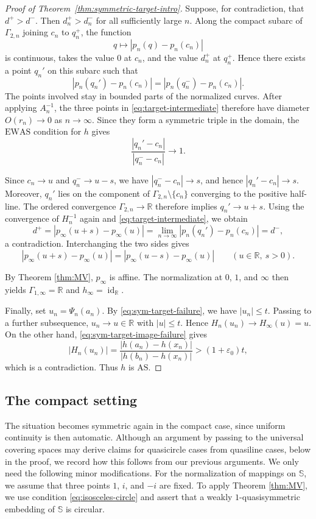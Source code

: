 \documentclass[10pt,a4paper]{amsart}
\numberwithin{equation}{section}
\newcommand{\R}{\mathbb{R}}
\newcommand{\id}{\operatorname{id}}
\begin{document}
\begin{proof}[Proof of Theorem~\ref{thm:symmetric-target-intro}]
Suppose, for contradiction, that $d^+>d^-$.  
Then $d_n^+>d_n^-$ for all sufficiently large $n$.  
Along the compact subarc of $\Gamma_{2,n}$ joining $c_n$ to $q_n^+$, the function
\[
 q\longmapsto |p_n(q)-p_n(c_n)|
\]
is continuous, takes the value $0$ at $c_n$, and the value $d_n^+$ at $q_n^+$.  
Hence there exists a point $q_n'$ on this subarc such that
\begin{equation}\label{eq:target-intermediate}
 |p_n(q_n')-p_n(c_n)|=|p_n(q_n^-)-p_n(c_n)|.
\end{equation}
The points involved stay in bounded parts of the normalized curves.
After applying $A_n^{-1}$, the three points in \eqref{eq:target-intermediate} therefore have diameter $O(r_n)\to0$
as $n \to \infty$.  
Since they form a symmetric  triple in the domain,
the $\mathrm{EWAS}$ condition for $h$ gives
\begin{equation*}
 \frac{|q_n'-c_n|}{|q_n^--c_n|}\to 1.
\end{equation*}

Since $c_n\to u$ and $q_n^-\to u-s$, we have $|q_n^--c_n|\to s$, and hence
$|q_n'-c_n|\to s$.
Moreover, $q_n'$ lies on the component of $\Gamma_{2,n}\setminus\{c_n\}$ converging to the positive half-line.
The ordered convergence $\Gamma_{2,n}\to\R$ therefore implies $q_n'\to  u+s$.
Using the convergence of $H_n^{-1}$ again and \eqref{eq:target-intermediate}, we obtain
\[
 d^+=|p_\infty(u+s)-p_\infty(u)|=\lim_{n\to\infty}|p_n(q_n')-p_n(c_n)|=d^-,
\]
a contradiction.  
Interchanging the two sides gives
\[
 |p_\infty(u+s)-p_\infty(u)|=|p_\infty(u-s)-p_\infty(u)|\qquad (u\in\R,\ s>0).
\]


By Theorem \ref{thm:MV}, $p_\infty$ is affine. 
The normalization at $0$, $1$, and $\infty$ then yields $\Gamma_{1,\infty}=\R$ and $h_\infty=\id_{\R}$.

Finally, set $u_n=\Psi_n(a_n)$.
By \eqref{eq:sym-target-failure}, we have $|u_n|\leq t$.
Passing to a further subsequence, $u_n\to u\in\R$ with $|u|\leq t$.
Hence $H_n(u_n)\to H_\infty(u)=u$.
On the other hand, \eqref{eq:sym-target-image-failure} gives
\[
 |H_n(u_n)|=\frac{|h(a_n)-h(x_n)|}{|h(b_n)-h(x_n)|}>(1+\varepsilon_0)t,
\]
which is  a contradiction.  
Thus $h$ is $\mathrm{AS}$.
\end{proof}

\subsection{The compact setting}

The situation becomes symmetric again in the compact case, since uniform continuity is then automatic.
Although an argument by passing to the universal covering spaces may derive claims for quasicircle cases from quasiline cases, below in the proof, we record how this follows from our previous arguments. 
We only need the following minor modifications.
For the normalization of mappings on $\mathbb S$, we assume that three points $1$, $i$, and $-i$ are fixed. 
To apply Theorem \ref{thm:MV}, we use condition \eqref{eq:isosceles-circle} and assert that a weakly $1$-quasisymmetric embedding of $\mathbb S$ is circular.
\end{document}
